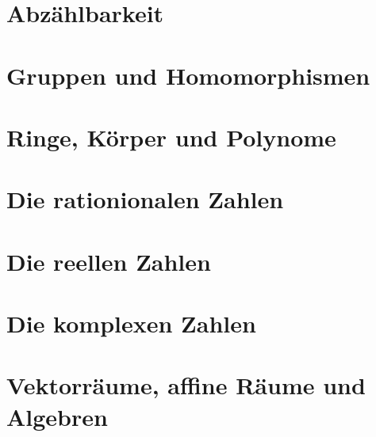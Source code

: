 \section{Abzählbarkeit}
\section{Gruppen und Homomorphismen}
\section{Ringe, Körper und Polynome}
\section{Die rationionalen Zahlen}
\section{Die reellen Zahlen}
\section{Die komplexen Zahlen}
\section{Vektorräume, affine Räume und Algebren}
